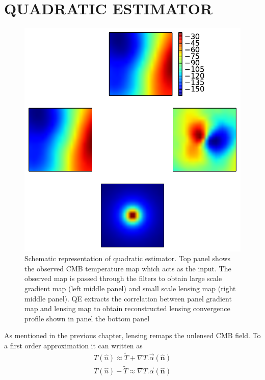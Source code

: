 \section{QUADRATIC ESTIMATOR}
\label{sec_method}
\begin{figure}[!ht]
\includegraphics[width=\linewidth]{figs/schematic_rep.pdf}
\caption{Schematic representation of quadratic estimator. Top panel shows the observed CMB temperature map which acts as the input. The observed map is passed through the filters to obtain large scale gradient map (left middle panel) and small scale lensing map (right middle panel). QE extracts the correlation between panel gradient map and lensing map to obtain reconstructed lensing convergence profile shown in panel the bottom panel}
\label{fig:QE_schem}
\end{figure}
As mentioned in the previous chapter, lensing remaps the unlensed CMB field. To a first order approximation it can written as
\begin{eqnarray}
T (\hat{n})\approx \tilde{T}+ \nabla T . \vec{\alpha}(\hat{\textbf{n}}) \\
T (\hat{n}) - \tilde{T} \approx \nabla T . \vec{\alpha}(\hat{\textbf{n}}) 
\end{eqnarray}
